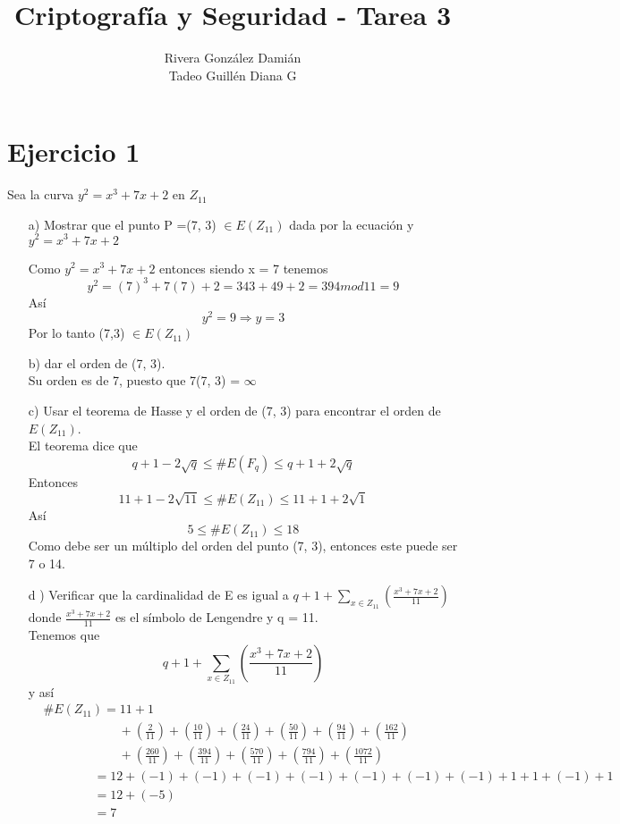 \documentclass[12pt, letterpaper]{article}
\title{Criptografía y Seguridad - Tarea 3}
\author{Rivera González Damián\\Tadeo Guillén Diana G}
\begin{document}
\maketitle
\section*{Ejercicio 1}
Sea la curva $y^2 = x^3 + 7x + 2$ en $Z_{11}$
\begin{itemize}
\item[a)] Mostrar que el punto P =(7, 3) $\in E(Z_{11})$ dada por la ecuación y $y^2 = x^3 + 7x + 2$

Como $y^2 = x^3 + 7x + 2$ entonces siendo x = 7 tenemos
$$y^2 = (7)^3 + 7(7) + 2 = 343+49+2 = 394 mod 11 = 9$$
Así
$$y^2 = 9 \Rightarrow  y = 3$$
Por lo tanto (7,3) $\in E(Z_{11})$

\item[b) ] dar el orden de (7, 3).\\
Su orden es de 7, puesto que 7(7, 3) = $\infty$

\item[c) ] Usar el teorema de Hasse y el orden de (7, 3) para encontrar el orden de $E(Z_{11})$.\\
El teorema dice que
$$q+1-2\sqrt{q} \leq \#E(F_q) \leq q+1+2\sqrt{q}$$
Entonces
$$11+1-2\sqrt{11} \leq \#E(Z_{11}) \leq 11+1+2\sqrt{1}$$
Así
$$5 \leq \#E(Z_{11}) \leq 18$$
Como debe ser un múltiplo del orden del punto (7, 3), entonces este puede ser 7 o 14.

\item[d ) ] Verificar que la cardinalidad de E es igual a $q+1+ \sum_{x \in Z_{11}} (\frac{x^3 + 7x + 2}{11})$ donde $\frac{x^3 + 7x + 2}{11}$ es el símbolo de Lengendre y q = 11.\\
Tenemos que 
$$q+1+ \sum_{x \in Z_{11}} (\frac{x^3 + 7x + 2}{11})$$
y así
\begin{equation*}
\begin{split}
	&\#E(Z_{11}) = 11+1\\
	&\quad\quad\quad\quad\quad\quad+\left(\frac{2}{11}\right)+\left(\frac{10}{11}\right)+\left(\frac{24}{11}\right)+\left(\frac{50}{11}\right)+\left(\frac{94}{11}\right)+\left(\frac{162}{11}\right)\\
	&\quad\quad\quad\quad\quad\quad+\left(\frac{260}{11}\right)+\left(\frac{394}{11}\right)+\left(\frac{570}{11}\right)+\left(\frac{794}{11}\right)+\left(\frac{1072}{11}\right)\\
	&\quad\quad\quad\quad = 12 + (-1)+(-1)+(-1)+(-1)+(-1)+(-1)+(-1)+1+1+(-1)+1\\
	&\quad\quad\quad\quad = 12 + (-5)\\ 
	&\quad\quad\quad\quad = 7
\end{split}
\end{equation*}
\end{itemize}
\end{document}
